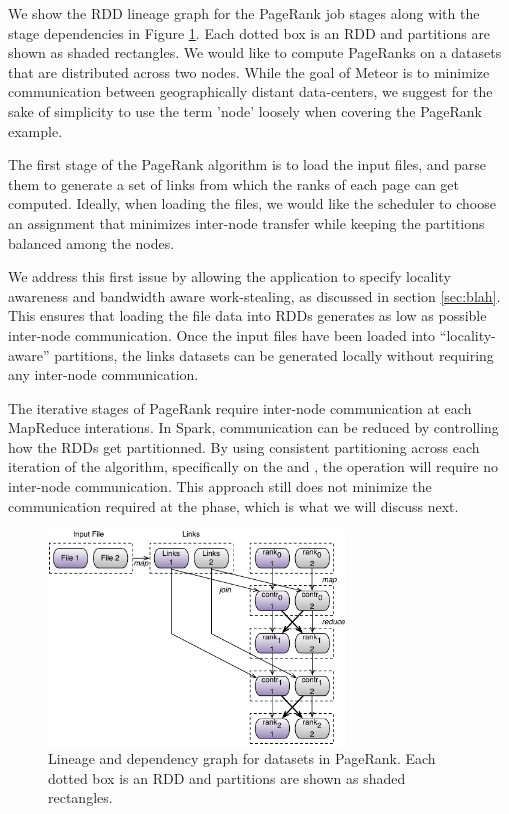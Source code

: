 We show the RDD lineage graph for the PageRank job stages along with the stage dependencies in Figure \ref{fig:lineage}. Each dotted box is an RDD and partitions are shown as shaded rectangles. We would like to compute PageRanks on a datasets that are distributed across two nodes. While the goal of Meteor is to minimize communication between geographically distant data-centers, we suggest for the sake of simplicity to use the term 'node' loosely when covering the PageRank example.

The first stage of the PageRank algorithm is to load the input files, and parse them to generate a set of links from which the ranks of each page can get computed. Ideally, when loading the files, we would like the scheduler to choose an assignment that minimizes inter-node transfer while keeping the partitions balanced among the nodes. 

We address this first issue by allowing the application to specify locality awareness and bandwidth aware work-stealing, as discussed in section \ref{sec:blah}. This ensures that loading the file data into RDDs generates as low as possible inter-node communication. Once the input files have been loaded into ``locality-aware'' partitions, the links datasets can be generated locally without requiring any inter-node communication. 

The iterative stages of PageRank require inter-node communication at each MapReduce interations. In Spark, communication can be reduced by controlling how the RDDs get partitionned. By using consistent partitioning across each iteration of the algorithm, specifically on the  and , the  operation will require no inter-node communication. This approach still does not minimize the communication required at the  phase, which is what we will discuss next.

\begin{figure}
    \centering
    \includegraphics[width=0.7\textwidth]{figs/lineage.pdf}
    \caption{Lineage and dependency graph for datasets in PageRank. Each dotted box is an RDD and partitions are shown as shaded rectangles.}
    \label{fig:lineage}
\end{figure}

%

